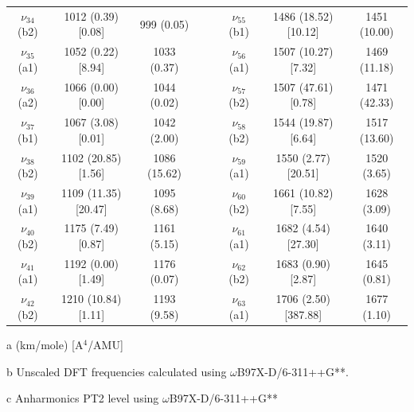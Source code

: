 \begin{table}[H]
\begin{center}
\begin{threeparttable}
{\begin{tabular}{c c c c c c c c}
$\nu_{34}$ (b2) & 1012 (0.39) [0.08] & 999 (0.05) &  &  & $\nu_{55}$ (b1) & 1486  (18.52) [10.12] & 1451 (10.00) \\ 
$\nu_{35}$ (a1) & 1052 (0.22) [8.94] & 1033 (0.37) &  &  & $\nu_{56}$ (a1) & 1507 (10.27) [7.32] & 1469 (11.18) \\ 
$\nu_{36}$ (a2) & 1066 (0.00) [0.00] & 1044 (0.02) &  &  & $\nu_{57}$ (b2) & 1507 (47.61) [0.78] & 1471 (42.33) \\ 
$\nu_{37}$ (b1) & 1067 (3.08) [0.01] & 1042 (2.00) &  &  & $\nu_{58}$ (b2) & 1544 (19.87) [6.64] & 1517 (13.60) \\ 
$\nu_{38}$ (b2) & 1102 (20.85) [1.56] & 1086 (15.62) &  &  & $\nu_{59}$ (a1) & 1550 (2.77) [20.51] & 1520 (3.65) \\ 
$\nu_{39}$ (a1) & 1109 (11.35) [20.47] & 1095 (8.68) &  &  & $\nu_{60}$ (b2) & 1661 (10.82) [7.55] & 1628 (3.09) \\ 
$\nu_{40}$ (b2) & 1175 (7.49) [0.87] & 1161 (5.15) &  &  & $\nu_{61}$ (a1) & 1682 (4.54) [27.30] & 1640 (3.11) \\ 
$\nu_{41}$ (a1) & 1192 (0.00) [1.49] & 1176 (0.07) &  &  & $\nu_{62}$ (b2) & 1683 (0.90) [2.87] & 1645 (0.81) \\ 
$\nu_{42}$ (b2) & 1210 (10.84) [1.11] & 1193 (9.58) &  &  & $\nu_{63}$ (a1) & 1706 (2.50) [387.88] & 1677 (1.10) \\ 
	\bottomrule
\end{tabular}}

\begin{tablenotes}
	\item[a] (km/mole) [A$^{4}$/AMU]
	\item[b] Unscaled DFT frequencies calculated using $\omega$B97X-D/6-311++G**.
	\item[c] Anharmonics PT2 level using $\omega$B97X-D/6-311++G** 
\end{tablenotes}
\end{threeparttable}
\end{center}
\label{freq-4,6-dimethyldibenzofuran}
\end{table}






